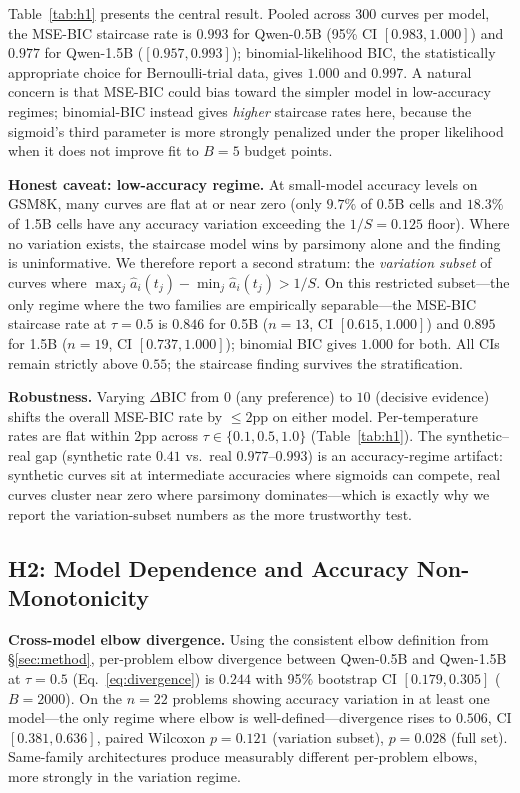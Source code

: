 \documentclass{article}
\begin{document}
Table~\ref{tab:h1} presents the central result.  Pooled across 300 curves per model, the MSE-BIC staircase rate is $0.993$ for Qwen-0.5B (95\% CI $[0.983, 1.000]$) and $0.977$ for Qwen-1.5B ($[0.957, 0.993]$); binomial-likelihood BIC, the statistically appropriate choice for Bernoulli-trial data, gives $1.000$ and $0.997$.  A natural concern is that MSE-BIC could bias toward the simpler model in low-accuracy regimes; binomial-BIC instead gives \emph{higher} staircase rates here, because the sigmoid's third parameter is more strongly penalized under the proper likelihood when it does not improve fit to $B{=}5$ budget points.

\textbf{Honest caveat: low-accuracy regime.}  At small-model accuracy levels on GSM8K, many curves are flat at or near zero (only $9.7\%$ of 0.5B cells and $18.3\%$ of 1.5B cells have any accuracy variation exceeding the $1/S{=}0.125$ floor).  Where no variation exists, the staircase model wins by parsimony alone and the finding is uninformative.  We therefore report a second stratum: the \emph{variation subset} of curves where $\max_j \hat{a}_i(t_j) - \min_j \hat{a}_i(t_j) > 1/S$.  On this restricted subset---the only regime where the two families are empirically separable---the MSE-BIC staircase rate at $\tau{=}0.5$ is $0.846$ for 0.5B ($n{=}13$, CI $[0.615, 1.000]$) and $0.895$ for 1.5B ($n{=}19$, CI $[0.737, 1.000]$); binomial BIC gives $1.000$ for both.  All CIs remain strictly above $0.55$; the staircase finding survives the stratification.

\textbf{Robustness.}  Varying $\Delta$BIC from $0$ (any preference) to $10$ (decisive evidence) shifts the overall MSE-BIC rate by $\leq 2$pp on either model.  Per-temperature rates are flat within $2$pp across $\tau\in\{0.1,0.5,1.0\}$ (Table~\ref{tab:h1}).  The synthetic--real gap (synthetic rate $0.41$ vs.\ real $0.977$--$0.993$) is an accuracy-regime artifact: synthetic curves sit at intermediate accuracies where sigmoids can compete, real curves cluster near zero where parsimony dominates---which is exactly why we report the variation-subset numbers as the more trustworthy test.

\subsection{H2: Model Dependence and Accuracy Non-Monotonicity}
\label{sec:h2}

\textbf{Cross-model elbow divergence.}  Using the consistent elbow definition from \S\ref{sec:method}, per-problem elbow divergence between Qwen-0.5B and Qwen-1.5B at $\tau{=}0.5$ (Eq.~\ref{eq:divergence}) is $0.244$ with 95\% bootstrap CI $[0.179, 0.305]$ ($B{=}2000$).  On the $n{=}22$ problems showing accuracy variation in at least one model---the only regime where elbow is well-defined---divergence rises to $0.506$, CI $[0.381, 0.636]$, paired Wilcoxon $p{=}0.121$ (variation subset), $p{=}0.028$ (full set).  Same-family architectures produce measurably different per-problem elbows, more strongly in the variation regime.
\end{document}
